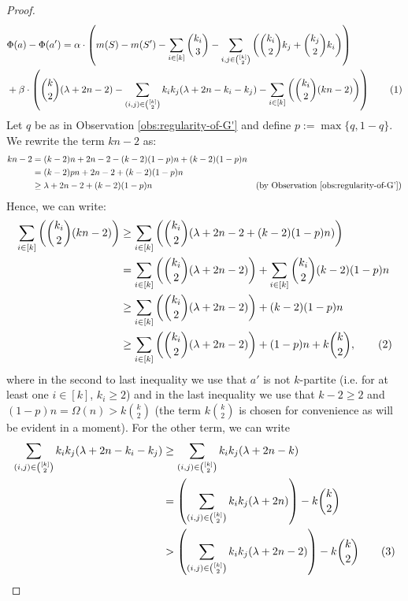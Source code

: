 \documentclass[a4paper,UKenglish,cleveref, autoref, thm-restate,numberwithinsect]{lipics-v2021}
\newcommand*\tageq{\refstepcounter{equation}\tag{\theequation}}
\begin{document}
\begin{proof}
    \begin{align*}
        &\Phi(a)-\Phi(a')  = \alpha\cdot \left(m(S) - m(S') - \sum_{i\in [k]}\binom{k_i}{3} - \sum_{i,j\in\binom{[k]}{2}}\left(\binom{k_i}{2}k_j + \binom{k_j}{2}k_i\right)\right) 
        \\ &+ \beta \cdot\left(\binom{k}{2} (\lambda + 2n-2)-\sum_{(i,j)\in \binom{[k]}{2}} k_ik_j (\lambda + 2n-k_i-k_j) - \sum_{i\in [k]} \left(\binom{k_i}{2}(kn-2)\right)\right) \tageq\label{full-eq}
    \end{align*}
    Let $q$ be as in Observation \ref{obs:regularity-of-G'} and define $p:=\max\{q,1-q\}$. We rewrite the term $kn-2$ as:
    \begin{align*}
        kn-2 &= (k-2)n + 2n - 2 - (k-2)(1-p)n + (k-2)(1-p)n\\
        &=(k-2)pn + 2n-2 + (k-2)(1-p)n \\
        &\geq \lambda + 2n-2 + (k-2)(1-p)n & \text{(by Observation \ref{obs:regularity-of-G'})}
    \end{align*}
    Hence, we can write:
    \begin{align*}
    \sum_{i\in [k]} \left(\binom{k_i}{2}(kn-2)\right) &\geq \sum_{i\in [k]} \left(\binom{k_i}{2}(\lambda + 2n-2 + (k-2)(1-p)n)\right) 
    \\ & = \sum_{i\in [k]} \left(\binom{k_i}{2}(\lambda + 2n-2)\right) + \sum_{i\in[k]}\binom{k_i}{2}(k-2)(1-p)n\\
    & \geq \sum_{i\in [k]} \left(\binom{k_i}{2}(\lambda + 2n-2)\right) + (k-2)(1-p)n\\
    &\geq \sum_{i\in [k]} \left(\binom{k_i}{2}(\lambda + 2n-2)\right) + (1-p)n + k\binom{k}{2}, \tageq\label{bound-first-term}
    \end{align*}
    where in the second to last inequality we use that $a'$ is not $k$-partite (i.e. for at least one $i\in[k]$, $k_i\geq 2$) and in the last inequality we use that $k-2\geq 2$ and $(1-p)n = \Omega(n) > k \binom{k}{2}$ (the term $k\binom{k}{2}$ is chosen for convenience as will be evident in a moment).
    For the other term, we can write 
    \begin{align*}
    \sum_{(i,j)\in \binom{[k]}{2}} k_ik_j (\lambda + 2n-k_i-k_j)  &\geq \sum_{(i,j)\in \binom{[k]}{2}} k_ik_j (\lambda + 2n-k)
    \\ &= \left(\sum_{(i,j)\in \binom{[k]}{2}} k_ik_j (\lambda + 2n) \right)- k\binom{k}{2}\\
    &> \left(\sum_{(i,j)\in \binom{[k]}{2}} k_ik_j (\lambda + 2n-2)\right) - k\binom{k}{2} \tageq \label{bound-second-term}

\end{align*}
\end{proof}
\end{document}
